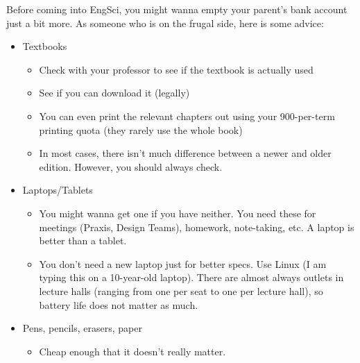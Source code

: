 Before coming into EngSci, you might wanna empty your parent's bank account just a bit more. As someone who is on the frugal side, here is some advice:

\begin{itemize}
    \item Textbooks
        \begin{itemize}
            \item Check with your professor to see if the textbook is actually used
            \item See if you can download it (legally)
            \item You can even print the relevant chapters out using your 900-per-term printing quota (they rarely use the whole book)
            \item In most cases, there isn't much difference between a newer and older edition. However, you should always check.
        \end{itemize}
    \item Laptops/Tablets
        \begin{itemize}
            \item You might wanna get one if you have neither. You need these for meetings (Praxis, Design Teams), homework, note-taking, etc. A laptop is better than a tablet.
            \item You don't need a new laptop just for better specs. Use Linux (I am typing this on a 10-year-old laptop). There are almost always outlets in lecture halls (ranging from one per seat to one per lecture hall), so battery life does not matter as much.
        \end{itemize}
    \item Pens, pencils, erasers, paper
        \begin{itemize}
            \item Cheap enough that it doesn't really matter.
        \end{itemize}
\end{itemize}
